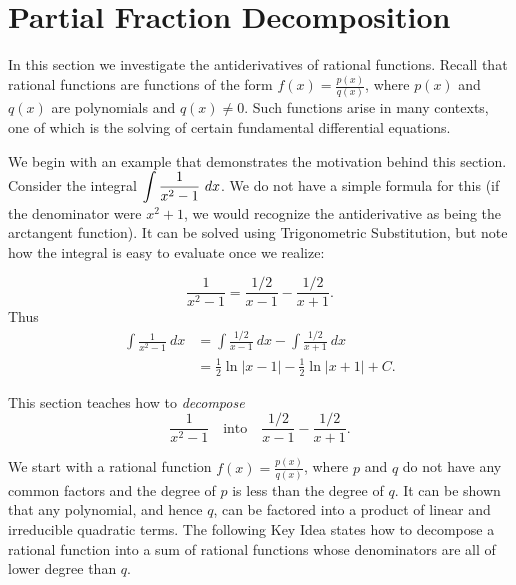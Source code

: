 \section{Partial Fraction Decomposition}\label{sec:partial_fraction}

In this section we investigate the antiderivatives of rational functions. Recall that rational functions are functions of the form $f(x)= \frac{p(x)}{q(x)}$, where $p(x)$ and $q(x)$ are polynomials and $q(x)\neq 0$. Such functions arise in many contexts, one of which is the solving of certain fundamental differential equations.

We begin with an example that demonstrates the motivation behind this section. Consider the integral $\displaystyle\int \frac{1}{x^2-1}\ dx$. We do not have a simple formula for this (if the denominator were $x^2+1$, we would recognize the antiderivative as being the arctangent function). It can be solved using Trigonometric Substitution, but note how the integral is easy to evaluate once we realize:

$$\frac{1}{x^2-1} = \frac{1/2}{x-1} - \frac{1/2}{x+1}.$$
Thus 
\begin{align*}
\int\frac{1}{x^2-1}\ dx &= \int\frac{1/2}{x-1}\ dx - \int\frac{1/2}{x+1}\ dx \\
			&= \frac12\ln|x-1| - \frac12\ln|x+1| + C.
\end{align*}

This section teaches how to \textit{decompose} $$\frac{1}{x^2-1}\quad  \text{into}\quad  \frac{1/2}{x-1}-\frac{1/2}{x+1}.$$

We start with a rational function $f(x)=\frac{p(x)}{q(x)}$, where $p$ and $q$ do not have any common factors and the degree of $p$ is less than the degree of $q$. It can be shown that any polynomial, and hence $q$, can be factored into a product of linear and irreducible quadratic terms. The following Key Idea states how to decompose a rational function into a sum of rational functions whose denominators are all of lower degree than $q$.


